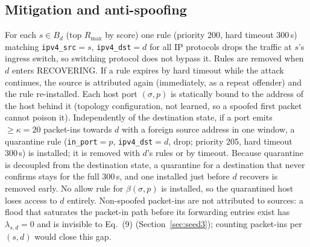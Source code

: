 \documentclass[conference]{IEEEtran}
\begin{document}
\subsection{Mitigation and anti-spoofing}
For each $s\in B_d$ (top $R_{\max}$ by score) one rule (priority 200, hard timeout 300\,s) matching \texttt{ipv4\_src}$=s$, \texttt{ipv4\_dst}$=d$ for all IP protocols drops the traffic at $s$'s ingress switch, so switching protocol does not bypass it. Rules are removed when $d$ enters RECOVERING. If a rule expires by hard timeout while the attack continues, the source is attributed again (immediately, as a repeat offender) and the rule re-installed. Each host port $(\sigma,p)$ is statically bound to the address of the host behind it (topology configuration, not learned, so a spoofed first packet cannot poison it). Independently of the destination state, if a port emits $\ge\kappa=20$ packet-ins towards $d$ with a foreign source address in one window, a quarantine rule (\texttt{in\_port}$=p$, \texttt{ipv4\_dst}$=d$, drop; priority 205, hard timeout 300\,s) is installed; it is removed with $d$'s rules or by timeout. Because quarantine is decoupled from the destination state, a quarantine for a destination that never confirms stays for the full 300\,s, and one installed just before $d$ recovers is removed early. No allow rule for $\beta(\sigma,p)$ is installed, so the quarantined host loses access to $d$ entirely. Non-spoofed packet-ins are not attributed to sources: a flood that saturates the packet-in path before its forwarding entries exist has $\lambda_{s,d}=0$ and is invisible to Eq.~(9) (Section~\ref{sec:seed3}); counting packet-ins per $(s,d)$ would close this gap.
\end{document}

